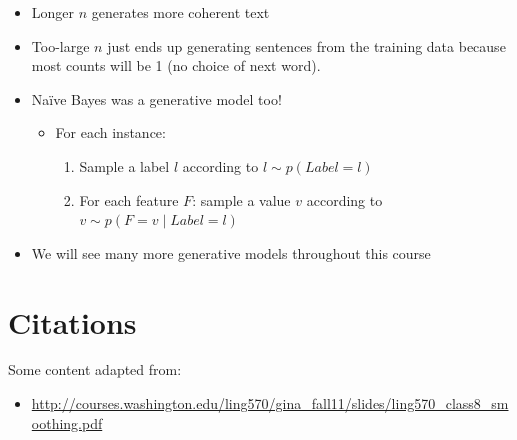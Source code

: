 \documentclass[11pt,letterpaper]{article}
\begin{document}
\begin{itemize}
  \item Longer $n$ generates more coherent text
  \item Too-large $n$ just ends up generating sentences from the training data because most counts will be 1 (no choice of next word).

  \item Na\"{i}ve Bayes was a generative model too!
    \begin{itemize}
      \item[] \hspace{-4mm} For each instance:
        \begin{enumerate}
          \item Sample a label $l$ according to $l \sim p(Label=l)$          
          \item For each feature $F$: sample a value $v$ according to $v \sim p(F=v \mid Label=l)$
        \end{enumerate}
    \end{itemize}

  \item We will see many more generative models throughout this course
\end{itemize}




\section{Citations}

Some content adapted from:

\begin{itemize}
  \item \url{http://courses.washington.edu/ling570/gina_fall11/slides/ling570_class8_smoothing.pdf}
\end{itemize}
\end{document}
